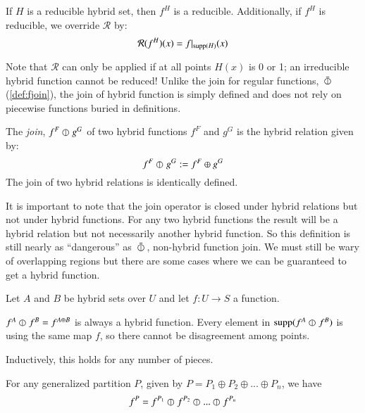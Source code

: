 \begin{definition}
If $H$ is a reducible hybrid set, then $f^H$ is a reducible. Additionally, if $f^H$ is reducible, we override $\mathcal{R}$ by:
\begin{equation}
\mathcal{R}(f^H)(x) = f|_{\text{supp}(H)}(x)
\end{equation}
\end{definition}

Note that $\mathcal{R}$ can only be applied if at all points $H(x)$ is 0 or 1; 
an irreducible hybrid function cannot be reduced!
Unlike the join for regular functions, $\,\bar{\varobar}\,$ (\ref{def:fjoin}), the join of hybrid function is simply defined and does not rely on piecewise functions buried in definitions.

\begin{definition}
The \emph{join}, $f^F \varobar^{} g^G$ of two hybrid functions $f^F$ and $g^G$ is the hybrid relation given by:
\begin{equation}
\label{def:hjoin}
f^F \varobar^{} g^G := f^F \oplus g^G
\end{equation}
The join of two hybrid relations is identically defined.
\end{definition}

It is important to note that the join operator is closed under hybrid relations but not under hybrid functions.
For any two hybrid functions the result will be a hybrid relation but not necessarily another hybrid function.
So this definition is still nearly as ``dangerous'' as  $\,\bar{\varobar}\,$, non-hybrid function join. 
We must still be wary of overlapping regions but there are some cases where we can be guaranteed to get a hybrid function.


Let $A$ and $B$ be hybrid sets over $U$ and let $f: U \to S$ a function.

$f^A \varobar^{} f^B = f^{A \oplus B}$ is always a hybrid function. 
Every element in $\text{supp}(f^A \varobar^{} f^B)$ is using the same map $f$, so there cannot be disagreement among points.

Inductively, this holds for any number of pieces.

For any generalized partition $P$, given by $P = P_1 \oplus P_2 \oplus ... \oplus P_n$, we have
\begin{equation}
 f^P = f^{P_1} \varobar^{} f^{P_2} \varobar^{} ... \varobar^{} f^{P_n}
\end{equation}

